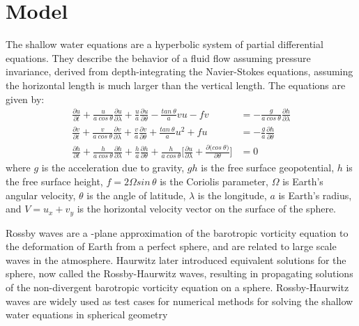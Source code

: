\documentclass[a4paper, 12pt, notitlepage]{report}
\begin{document}
  \section{Model}
  The shallow water equations are a hyperbolic system of partial differential
  equations. They describe the behavior of a fluid flow assuming pressure
  invariance, derived from depth-integrating the Navier-Stokes equations,
  assuming the horizontal length is much larger than the vertical length.
  The equations are given by:
  \begin{equation} \label{swe}
    \begin{split}
      \frac{\partial u}{\partial t} + \frac{u}{a\ cos\ \theta}\frac{\partial
        u}{\partial \lambda} + \frac{u}{a}\frac{\partial u}{\partial \theta} -
      \frac{tan\ \theta}{a}vu - fv &= -\frac{g}{a\ cos\ \theta}\frac{\partial
        h}{\partial \lambda} \\
      \frac{\partial v}{\partial t} + \frac{v}{a\ cos\ \theta}\frac{\partial
        v}{\partial \lambda} + \frac{v}{a}\frac{\partial v}{\partial \theta} +
      \frac{tan\ \theta}{a}u^2+fu&=-\frac{g}{a}\frac{\partial h}{\partial
        \theta} \\
      \frac{\partial h}{\partial t} + \frac{h}{a\ cos\ \theta}\frac{\partial
        h}{\partial \lambda} + \frac{h}{a}\frac{\partial h}{\partial \theta} +
      \frac{h}{a\ cos\ \theta}\bigg[\frac{\partial u}{\partial \lambda} +
        \frac{\partial \big(cos\ \theta\big)}{\partial \theta}\bigg] &= 0
    \end{split}
  \end{equation}
  where \(g\) is the acceleration due to gravity, \(gh\) is the free surface
  geopotential, \(h\) is the free surface height, \(f=2\Omega sin\, \theta\) is
  the Coriolis parameter, \(\Omega\) is Earth's angular velocity, \(\theta\) is
  the angle of latitude, \(\lambda\) is the longitude, \(a\) is Earth's radius,
  and \(V=u_x+v_y\) is the horizontal velocity vector on the surface of the
  sphere.
  \par
  Rossby waves are a \beta-plane approximation of the barotropic vorticity
  equation to the deformation of Earth from a perfect sphere, and are related to
  large scale waves in the atmosphere. Haurwitz later introduced equivalent
  solutions for the sphere, now called the Rossby-Haurwitz waves, resulting in
  propagating solutions of the non-divergent barotropic vorticity equation on a
  sphere. Rossby-Haurwitz waves are widely used as test cases for numerical
  methods for solving the shallow water equations in spherical geometry
\end{document}
